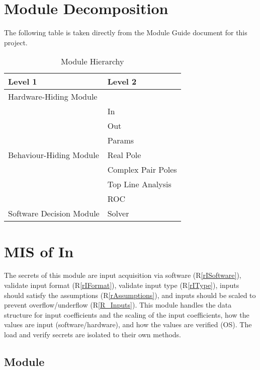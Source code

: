 \documentclass[12pt, titlepage]{article}
\newcommand{\rref}[1]{(R\ref{#1})}
\begin{document}
\section{Module Decomposition}

The following table is taken directly from the Module Guide document for this project.

\begin{table}[!ht]
\centering
\begin{tabular}{p{} p{}}
\toprule
\textbf{Level 1} & \textbf{Level 2}\\
\midrule

\multirow{1}{0.3\textwidth}{Hardware-Hiding Module} & \\

\midrule

\multirow{7}{0.3\textwidth}{Behaviour-Hiding Module}
  & In\\
  & Out\\
  & Params\\
  & Real Pole\\
  & Complex Pair Poles\\ 
  & Top Line Analysis\\
  & ROC\\
\midrule

{Software Decision Module} & Solver\\
\bottomrule

\end{tabular}
\caption{Module Hierarchy}
\label{tb:module}
\end{table}


\section{MIS of In} \label{sc:MIS_IN}

The secrets of this module are
 input acquisition via software \rref{rISoftware},
 validate input format \rref{rIFormat},
 validate input type \rref{rIType},
 inputs should satisfy the assumptions \rref{rAssumptions}, and
 inputs should be scaled to prevent overflow/underflow \rref{R_Inputs}.
This module handles the data structure for input coefficients and the scaling of
 the input coefficients, how the values are input (software/hardware),
 and how the values are verified (OS).
The load and verify secrets are isolated to their own methods.

\subsection{Module}
\end{document}
